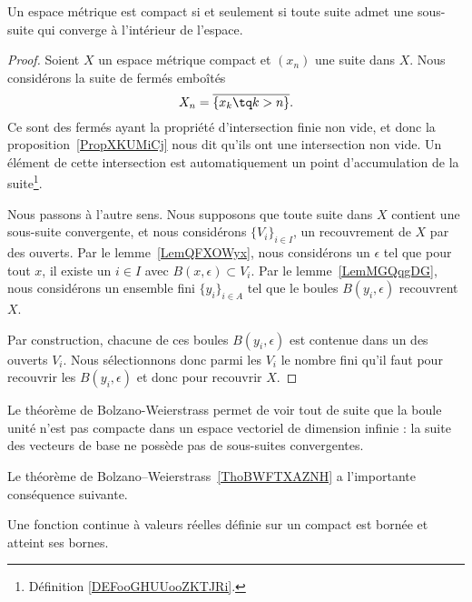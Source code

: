 \begin{theorem}\label{ThoBWFTXAZNH}
    Un espace métrique est compact si et seulement si toute suite admet une sous-suite qui converge à l'intérieur de l'espace.
\end{theorem}

\begin{proof}
   Soient \( X\) un espace métrique compact et \( (x_n)\) une suite dans \( X\). Nous considérons la suite de fermés emboîtés
   \begin{equation}
       X_n=\overline{ \{ x_k\tq k>n \} }.
   \end{equation}
   Ce sont des fermés ayant la propriété d'intersection finie non vide, et donc la proposition~\ref{PropXKUMiCj} nous dit qu'ils ont une intersection non vide. Un élément de cette intersection est automatiquement un point d'accumulation de la suite\footnote{Définition \ref{DEFooGHUUooZKTJRi}.}.

   Nous passons à l'autre sens. Nous supposons que toute suite dans \( X\) contient une sous-suite convergente, et nous considérons \( \{ V_i \}_{i\in I}\), un recouvrement de \( X\) par des ouverts. Par le lemme~\ref{LemQFXOWyx}, nous considérons un \( \epsilon\) tel que pour tout \( x\), il existe un \( i\in I\) avec \( B(x,\epsilon)\subset V_i\). Par le lemme~\ref{LemMGQqgDG}, nous considérons un ensemble fini \( \{ y_i \}_{i\in A}\) tel que le boules \( B(y_i,\epsilon)\) recouvrent \( X\).

   Par construction, chacune de ces boules \( B(y_i,\epsilon)\) est contenue dans un des ouverts \( V_i\). Nous sélectionnons donc parmi les \( V_i\) le nombre fini qu'il faut pour recouvrir les \( B(y_i,\epsilon)\) et donc pour recouvrir \( X\).
\end{proof}

\begin{example}\label{ExEFYooTILPDk}
    Le théorème de Bolzano-Weierstrass permet de voir tout de suite que la boule unité n'est pas compacte dans un espace vectoriel de dimension infinie : la suite des vecteurs de base ne possède pas de sous-suites convergentes.
\end{example}


Le théorème de Bolzano–Weierstrass~\ref{ThoBWFTXAZNH} a l'importante conséquence suivante.
\begin{theorem}[Weierstrass]		\label{ThoWeirstrassRn}
	Une fonction continue à valeurs réelles définie sur un compact est bornée et atteint ses bornes.
\end{theorem}

